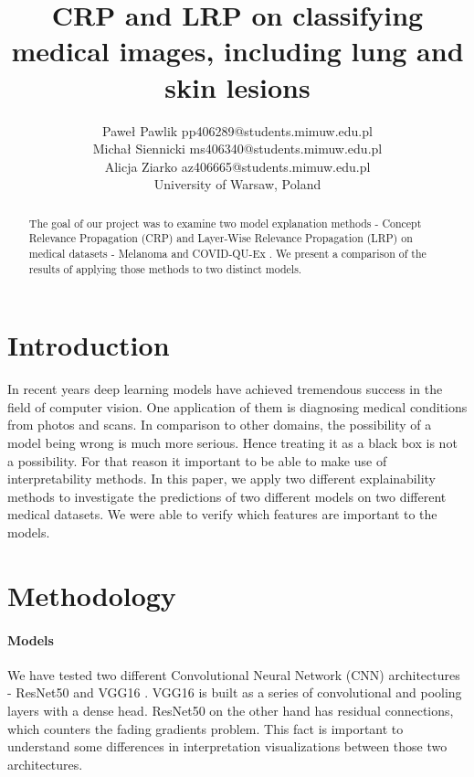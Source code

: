\documentclass[twoside,11pt]{article}
\begin{document}
\title{
CRP and LRP on classifying medical images, including lung and skin lesions
}

\author{\name Paweł Pawlik \email pp406289@students.mimuw.edu.pl \\
    \name Michał Siennicki \email ms406340@students.mimuw.edu.pl \\
    \name Alicja Ziarko \email az406665@students.mimuw.edu.pl \\
    \addr University of Warsaw, Poland\\
}

\maketitle

\begin{abstract}%
The goal of our project was to examine two model explanation methods - Concept
Relevance Propagation (CRP) \citep{https://doi.org/10.48550/arxiv.2206.03208} and 
Layer-Wise Relevance Propagation (LRP) \citep{Montavon2019} on medical datasets - Melanoma \citep{melanoma} and COVID-QU-Ex \citep{covid}. We present a comparison of the results of applying those methods to two distinct models.

\end{abstract}

\section{Introduction}
In recent years deep learning models have achieved tremendous success in the field of computer vision. One application of them is diagnosing medical conditions from photos and scans. In comparison to other domains, the possibility of a model being wrong is much more serious. Hence treating it as a black box is not a possibility. For that reason it important to be able to make use of interpretability methods. In this paper, we apply two different explainability methods to investigate the predictions of two different models on two different medical datasets. We were able to verify which features are important to the models.

\section{Methodology}

\paragraph{Models}
We have tested two different Convolutional Neural Network (CNN) architectures - ResNet50 \citep{DBLP:journals/corr/HeZRS15} and VGG16 \citep{https://doi.org/10.48550/arxiv.1409.1556}. VGG16 is built as a series of convolutional and pooling layers with a dense head. ResNet50 on the other hand has residual connections, which counters the fading gradients problem. This fact is important to understand some differences in interpretation visualizations between those two architectures.
\end{document}
